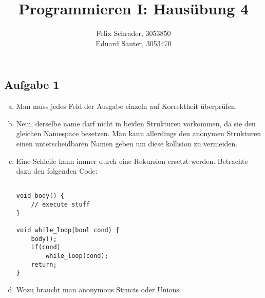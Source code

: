 \documentclass[11pt]{article}
\author{Felix Schrader, 3053850 \\
      Eduard Sauter, 3053470 }
\title{Programmieren I: Haus\"ubung 4}
\begin{document}
\maketitle
\subsection*{Aufgabe 1}
\begin{enumerate}[a)]
  \item Man muss jedes Feld der Ausgabe einzeln auf Korrektheit \"uberpr\"ufen.

  \item Nein, derselbe name darf nicht in beiden Strukturen vorkommen, 
    da sie den gleichen Namespace besetzen. Man kann allerdings den
    anonymen Strukturen einen unterscheidbaren Namen geben um diese kollision
    zu vermeiden.

  \item Eine Schleife kann immer durch eine Rekursion ersetzt werden. 
    Betrachte dazu den folgenden Code:
\begin{lstlisting}
  
void body() {
    // execute stuff
}

void while_loop(bool cond) {
    body();
    if(cond)
        while_loop(cond);
    return;
}
\end{lstlisting}
  \item
    Wozu braucht man anonymous Structs oder Unions.
    
\end{enumerate} 
\end{document}
